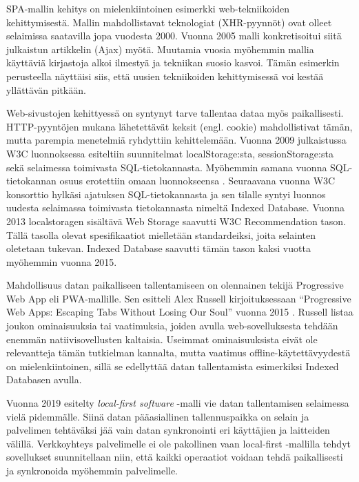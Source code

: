 \documentclass[finnish,twoside,censored,csm,sw-track-2018]{HYthesisML}
\begin{document}
SPA-mallin kehitys on mielenkiintoinen esimerkki web-tekniikoiden kehittymisestä. Mallin mahdollistavat teknologiat (XHR-pyynnöt) ovat olleet selaimissa saatavilla jopa vuodesta 2000. Vuonna 2005 malli konkretisoitui siitä julkaistun artikkelin (Ajax) myötä. Muutamia vuosia myöhemmin mallia käyttäviä kirjastoja alkoi ilmestyä ja tekniikan suosio kasvoi. Tämän esimerkin perusteella näyttäisi siis, että uusien tekniikoiden kehittymisessä voi kestää yllättävän pitkään.

Web-sivustojen kehittyessä on syntynyt tarve tallentaa dataa myös paikallisesti. HTTP-pyyntöjen mukana lähetettävät keksit (engl. cookie) mahdollistivat tämän, mutta parempia menetelmiä ryhdyttiin kehittelemään. Vuonna 2009 julkaistussa W3C luonnoksessa \citep{W3C-2009-webstorage} esiteltiin suunnitelmat localStorage:sta, sessionStorage:sta sekä selaimessa toimivasta SQL-tietokannasta. Myöhemmin samana vuonna SQL-tietokannan osuus erotettiin omaan luonnokseensa \citep{W3C-2009-webdatabase}. Seuraavana vuonna W3C konsorttio hylkäsi \citep{W3C-2010-sqldatabase} ajatuksen SQL-tietokannasta ja sen tilalle syntyi luonnos \citep{W3C-2010-indexeddb} uudesta selaimassa toimivasta tietokannasta nimeltä Indexed Database. Vuonna 2013 localstoragen sisältävä Web Storage saavutti W3C Recommendation tason. Tällä tasolla olevat spesifikaatiot mielletään standardeiksi, joita selainten oletetaan tukevan. Indexed Database saavutti tämän tason kaksi vuotta myöhemmin vuonna 2015.

Mahdollisuus datan paikalliseen tallentamiseen on olennainen tekijä Progressive Web App eli PWA-mallille. Sen esitteli Alex Russell kirjoituksessaan ``Progressive Web Apps: Escaping Tabs Without Losing Our Soul'' vuonna 2015 \citep{pwa-coined}. Russell listaa joukon ominaisuuksia tai vaatimuksia, joiden avulla web-sovelluksesta tehdään enemmän natiivisovellusten kaltaisia. Useimmat ominaisuuksista eivät ole relevantteja tämän tutkielman kannalta, mutta vaatimus offline-käytettävyydestä on mielenkiintoinen, sillä se edellyttää datan tallentamista esimerkiksi Indexed Databasen avulla.

Vuonna 2019 esitelty \citep{local-first} \textit{local-first software} -malli vie datan tallentamisen selaimessa vielä pidemmälle. Siinä datan pääasiallinen tallennuspaikka on selain ja palvelimen tehtäväksi jää vain datan synkronointi eri käyttäjien ja laitteiden välillä. Verkkoyhteys palvelimelle ei ole pakollinen vaan local-first -mallilla tehdyt sovellukset suunnitellaan niin, että kaikki operaatiot voidaan tehdä paikallisesti ja synkronoida myöhemmin palvelimelle.
\end{document}
